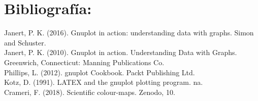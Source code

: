 \documentclass[11.5pt,a4paper]{article}
\begin{document}
\section*{Bibliografía:}

Janert, P. K. (2016). Gnuplot in action: understanding data with graphs. Simon and Schuster.\\

Janert, P. K. (2010). Gnuplot in action. Understanding Data with Graphs. Greenwich, Connecticut: Manning Publications Co.\\

Phillips, L. (2012). gnuplot Cookbook. Packt Publishing Ltd.\\

Kotz, D. (1991). LATEX and the gnuplot plotting program. na.\\

Crameri, F. (2018). Scientific colour-maps. Zenodo, 10.
\end{document}
